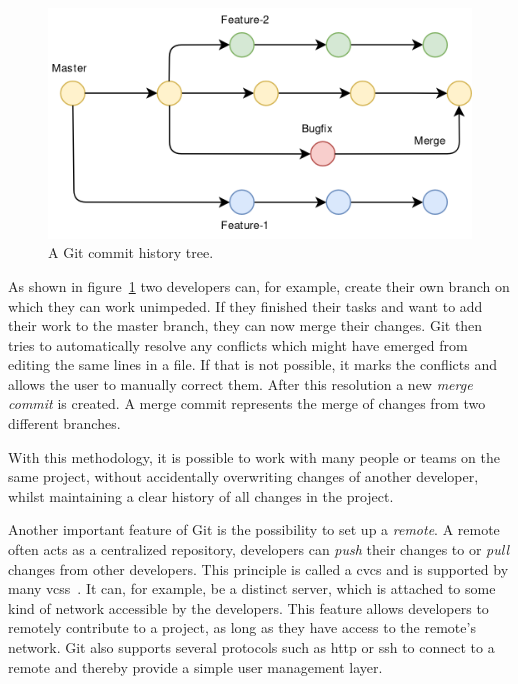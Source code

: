 \begin{figure}[H]
    \includegraphics[scale=0.35]{./graphs/git-history-branch}
    \centering
    \caption{A Git commit history tree.}\label{fig:git-commit-tree}
\end{figure}

As shown in figure~\ref{fig:git-commit-tree} two developers can, for example, create their own branch on which they can work unimpeded.
If they finished their tasks and want to add their work to the master branch, they can now merge their changes.
Git then tries to automatically resolve any conflicts which might have emerged from editing the same lines in a file.
If that is not possible, it marks the conflicts and allows the user to manually correct them.
After this resolution a new \emph{merge commit} is created.
A merge commit represents the merge of changes from two different branches.

With this methodology, it is possible to work with many people or teams on the same project, without accidentally overwriting changes of another developer, whilst maintaining a clear history of all changes in the project.

Another important feature of Git is the possibility to set up a \emph{remote}.
A remote often acts as a centralized repository, developers can \emph{push} their changes to or \emph{pull} changes from other developers.
This principle is called a \ac{cvcs} and is supported by many \acp{vcs}~\cite{version-control}.
It can, for example, be a distinct server, which is attached to some kind of network accessible by the developers.
This feature allows developers to remotely contribute to a project, as long as they have access to the remote's network.
Git also supports several protocols such as \ac{http} or \ac{ssh} to connect to a remote and thereby provide a simple user management layer.


